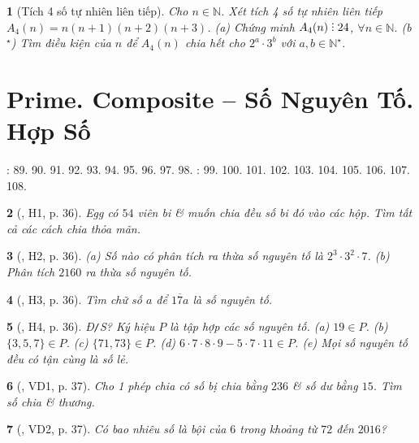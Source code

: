 \documentclass{article}
\newtheorem{baitoan}{}
\DeclareRobustCommand{\divby}{%
	\mathrel{\vbox{\baselineskip.65ex\lineskiplimit0pt\hbox{.}\hbox{.}\hbox{.}}}%
}
\begin{document}
\begin{baitoan}[Tích 4 số tự nhiên liên tiếp]
	Cho $n\in\mathbb{N}$. Xét tích 4 số tự nhiên liên tiếp $A_4(n) = n(n + 1)(n + 2)(n + 3)$. (a) Chứng minh $A_4(n)\divby24$, $\forall n\in\mathbb{N}$. (b${}^\star$) Tìm điều kiện của $n$ để $A_4(n)$ chia hết cho $2^a\cdot3^b$ với $a,b\in\mathbb{N}^\star$.
\end{baitoan}


\section{Prime. Composite -- Số Nguyên Tố. Hợp Số}
\cite[\S10, pp. 29--30]{SBT_Toan_6_Canh_Dieu_tap_1}: 89. 90. 91. 92. 93. 94. 95. 96. 97. 98. \cite[\S11, pp. 31--32]{SBT_Toan_6_Canh_Dieu_tap_1}: 99. 100. 101. 102. 103. 104. 105. 106. 107. 108.

\begin{baitoan}[\cite{Binh_boi_duong_Toan_6_tap_1}, H1, p. 36]
	Egg có $54$ viên bi \& muốn chia đều số bi đó vào các hộp. Tìm tất cả các cách chia thỏa mãn.
\end{baitoan}

\begin{baitoan}[\cite{Binh_boi_duong_Toan_6_tap_1}, H2, p. 36]
	(a) Số nào có phân tích ra thừa số nguyên tố là $2^3\cdot3^2\cdot7$. (b) Phân tích $2160$ ra thừa số nguyên tố.
\end{baitoan}

\begin{baitoan}[\cite{Binh_boi_duong_Toan_6_tap_1}, H3, p. 36]
	Tìm chữ số $a$ để $\overline{17a}$ là số nguyên tố.
\end{baitoan}

\begin{baitoan}[\cite{Binh_boi_duong_Toan_6_tap_1}, H4, p. 36]
	{\rm Đ{\tt/}S?} Ký hiệu $P$ là tập hợp các số nguyên tố. (a) $19\in P$. (b) $\{3,5,7\}\in P$. (c) $\{71,73\}\in P$. (d) $6\cdot7\cdot8\cdot9 - 5\cdot7\cdot11\in P$. (e) Mọi số nguyên tố đều có tận cùng là số lẻ.
\end{baitoan}

\begin{baitoan}[\cite{Binh_boi_duong_Toan_6_tap_1}, VD1, p. 37]
	Cho 1 phép chia có số bị chia bằng $236$ \& số dư bằng $15$. Tìm số chia \& thương.
\end{baitoan}

\begin{baitoan}[\cite{Binh_boi_duong_Toan_6_tap_1}, VD2, p. 37]
	Có bao nhiêu số là bội của $6$ trong khoảng từ $72$ đến $2016$?
\end{baitoan}
\end{document}
